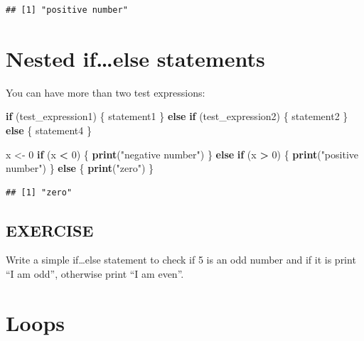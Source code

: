 \documentclass[
]{book}
\newenvironment{Shaded}{\begin{snugshade}}{\end{snugshade}}
\newcommand{\ControlFlowTok}[1]{\textcolor[rgb]{0.13,0.29,0.53}{\textbf{#1}}}
\newcommand{\DecValTok}[1]{\textcolor[rgb]{0.00,0.00,0.81}{#1}}
\newcommand{\KeywordTok}[1]{\textcolor[rgb]{0.13,0.29,0.53}{\textbf{#1}}}
\newcommand{\NormalTok}[1]{#1}
\newcommand{\OperatorTok}[1]{\textcolor[rgb]{0.81,0.36,0.00}{\textbf{#1}}}
\newcommand{\StringTok}[1]{\textcolor[rgb]{0.31,0.60,0.02}{#1}}
\begin{document}
\begin{verbatim}
## [1] "positive number"
\end{verbatim}

\hypertarget{nested-ifelse-statements}{%
\section{Nested if\ldots else statements}\label{nested-ifelse-statements}}

You can have more than two test expressions:

\begin{Shaded}
\begin{Highlighting}[]
\ControlFlowTok{if}\NormalTok{ (test_expression1) \{}
\NormalTok{  statement1}
\NormalTok{\} }\ControlFlowTok{else} \ControlFlowTok{if}\NormalTok{ (test_expression2) \{}
\NormalTok{    statement2}
\NormalTok{\} }\ControlFlowTok{else}\NormalTok{ \{}
\NormalTok{      statement4}
\NormalTok{\}}
\end{Highlighting}
\end{Shaded}

\begin{Shaded}
\begin{Highlighting}[]
\NormalTok{x <-}\StringTok{ }\DecValTok{0}
\ControlFlowTok{if}\NormalTok{ (x }\OperatorTok{<}\StringTok{ }\DecValTok{0}\NormalTok{) \{}
   \KeywordTok{print}\NormalTok{(}\StringTok{"negative number"}\NormalTok{)}
\NormalTok{\} }\ControlFlowTok{else} \ControlFlowTok{if}\NormalTok{ (x }\OperatorTok{>}\StringTok{ }\DecValTok{0}\NormalTok{) \{}
   \KeywordTok{print}\NormalTok{(}\StringTok{"positive number"}\NormalTok{)}
\NormalTok{\} }\ControlFlowTok{else}\NormalTok{ \{}
   \KeywordTok{print}\NormalTok{(}\StringTok{"zero"}\NormalTok{)}
\NormalTok{\}}
\end{Highlighting}
\end{Shaded}

\begin{verbatim}
## [1] "zero"
\end{verbatim}

\hypertarget{exercise}{%
\subsection{EXERCISE}\label{exercise}}

Write a simple if\ldots else statement to check if 5 is an odd number and if it is print ``I am odd'', otherwise print ``I am even''.

\hypertarget{loops}{%
\section{Loops}\label{loops}}
\end{document}
